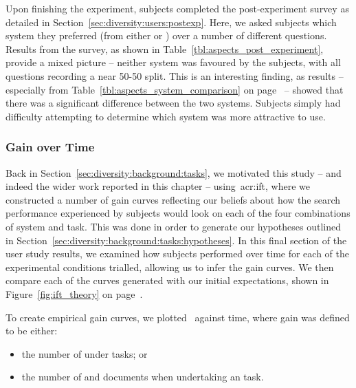 Upon finishing the experiment, subjects completed the post-experiment survey as detailed in Section~\ref{sec:diversity:users:postexp}. Here, we asked subjects which system they preferred (from either  or ) over a number of different questions. Results from the survey, as shown in Table~\ref{tbl:aspects_post_experiment}, provide a mixed picture -- neither system was favoured by the subjects, with all questions recording a near 50-50 split. This is an interesting finding, as results -- especially from Table~\ref{tbl:aspects_system_comparison} on page~\pageref{tbl:aspects_system_comparison} -- showed that there was a significant difference between the two systems. Subjects simply had difficulty attempting to determine which system was more attractive to use.

\vspace*{-2mm}
\subsubsection{Gain over Time}\label{sec:diversity:users:results:ift}
\vspace*{-2mm}
Back in Section~\ref{sec:diversity:background:tasks}, we motivated this study -- and indeed the wider work reported in this chapter -- using~\gls{acr:ift}, where we constructed a number of gain curves reflecting our beliefs about how the search performance experienced by subjects would look on each of the four combinations of system and task. This was done in order to generate our hypotheses outlined in Section~\ref{sec:diversity:background:tasks:hypotheses}. In this final section of the user study results, we examined how subjects performed over time for each of the experimental conditions trialled, allowing us to infer the gain curves. We then compare each of the curves generated with our initial expectations, shown in Figure~\ref{fig:ift_theory} on page~\pageref{fig:ift_theory}.

To create empirical gain curves, we plotted~ against time, where gain was defined to be either:

\vspace*{-2mm}
\begin{itemize}
    \item{the number of  under  tasks; or}
    \item{the number of  and  documents when undertaking an  task.}
\end{itemize}
\vspace*{-2mm}

